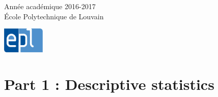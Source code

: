 \documentclass[a4paper]{article}
\begin{document}
\begin{titlepage}

{\large Ann\'ee acad\'emique 2016-2017}\\[0,25cm] 
{\large \'Ecole Polytechnique de Louvain}\\[1cm]


\begin{center}
  \includegraphics[width = 20mm]{img/epl.jpg} \hfill
\end{center}

\vfill %
\end{titlepage}


\section{Part 1 : Descriptive statistics}
\end{document}
